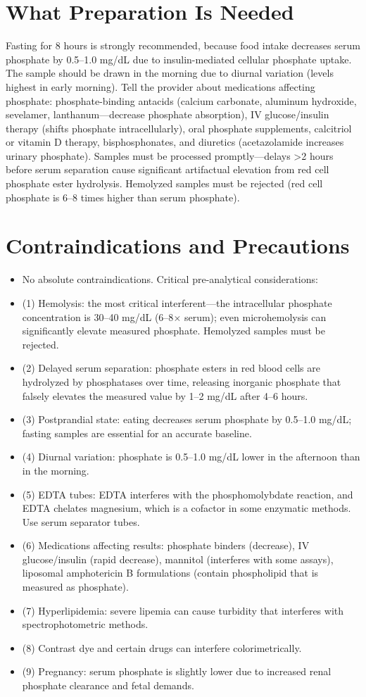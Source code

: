 \section*{What Preparation Is Needed}
Fasting for 8 hours is strongly recommended, because food intake decreases serum phosphate by 0.5--1.0 mg/dL due to insulin-mediated cellular phosphate uptake. The sample should be drawn in the morning due to diurnal variation (levels highest in early morning). Tell the provider about medications affecting phosphate: phosphate-binding antacids (calcium carbonate, aluminum hydroxide, sevelamer, lanthanum---decrease phosphate absorption), IV glucose/insulin therapy (shifts phosphate intracellularly), oral phosphate supplements, calcitriol or vitamin D therapy, bisphosphonates, and diuretics (acetazolamide increases urinary phosphate). Samples must be processed promptly---delays >2 hours before serum separation cause significant artifactual elevation from red cell phosphate ester hydrolysis. Hemolyzed samples must be rejected (red cell phosphate is 6--8 times higher than serum phosphate).

\section*{Contraindications and Precautions}
\begin{itemize}
  \item No absolute contraindications. Critical pre-analytical considerations:
  \item (1) Hemolysis: the most critical interferent---the intracellular phosphate concentration is 30--40 mg/dL (6--8$\times$ serum); even microhemolysis can significantly elevate measured phosphate. Hemolyzed samples must be rejected.
  \item (2) Delayed serum separation: phosphate esters in red blood cells are hydrolyzed by phosphatases over time, releasing inorganic phosphate that falsely elevates the measured value by 1--2 mg/dL after 4--6 hours.
  \item (3) Postprandial state: eating decreases serum phosphate by 0.5--1.0 mg/dL; fasting samples are essential for an accurate baseline.
  \item (4) Diurnal variation: phosphate is 0.5--1.0 mg/dL lower in the afternoon than in the morning.
  \item (5) EDTA tubes: EDTA interferes with the phosphomolybdate reaction, and EDTA chelates magnesium, which is a cofactor in some enzymatic methods. Use serum separator tubes.
  \item (6) Medications affecting results: phosphate binders (decrease), IV glucose/insulin (rapid decrease), mannitol (interferes with some assays), liposomal amphotericin B formulations (contain phospholipid that is measured as phosphate).
  \item (7) Hyperlipidemia: severe lipemia can cause turbidity that interferes with spectrophotometric methods.
  \item (8) Contrast dye and certain drugs can interfere colorimetrically.
  \item (9) Pregnancy: serum phosphate is slightly lower due to increased renal phosphate clearance and fetal demands.
\end{itemize}
